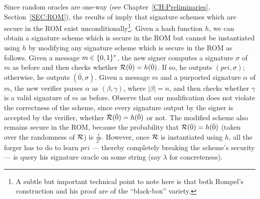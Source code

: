 Since random oracles are one-way (see Chapter~\ref{CH:Preliminaries},
Section~\ref{SEC:ROM}), the results of \cite{rompel:1waysigs} imply that
signature schemes which are secure in the ROM exist unconditionally\footnote{A
subtle but important technical point to note here is that both Rompel's
construction and his proof are of the ``black-box'' variety.}. Given a hash
function $h$, we can obtain a signature scheme which is secure in the ROM but
cannot be instantiated using $h$ by modifying any signature scheme which is
secure in the ROM as follows. Given a message $m \in \{0,1\}^{*}$, the new signer
computes a signature $\sigma$ of $m$ as before and then checks whether
$\mathcal{R}(\bar{0}) = h(\bar{0})$. If so, he outputs $(pri,\sigma)$; otherwise, he
outputs $(\bar{0},\sigma)$. 
Given a message $m$ and a purported signature $\alpha$ of $m$, the new
verifier parses $\alpha$ as $(\beta,\gamma)$, where $|\beta| = n$, and then
checks whether $\gamma$ is a valid signature of $m$ as before.
Observe that our modification does not violate the correctness of the scheme,
since every signature output by the signer is accepted by the verifier,
whether $\mathcal{R}(\bar{0}) = h(\bar{0})$ or not. The modified scheme also
remains secure in the ROM, because the probability that $\mathcal{R}(\bar{0}) =
h(\bar{0})$ (taken over the randomness of $\mathcal{R}$) is $\frac{1}{2^n}$. 
However, once $\mathcal{R}$ is instantiated using $h$, all the forger has to do to
learn $pri$ --- thereby completely breaking the scheme's security --- is query
his signature oracle on some string (say $\lambda$ for concreteness).

